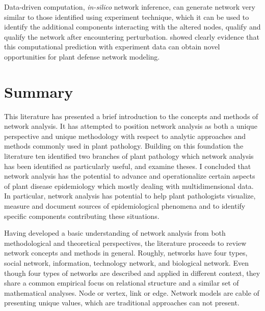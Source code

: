 Data-driven computation, \textit{in-silico} network inference, can generate network very similar to those identified using experiment technique, which it can be used to identify the additional components interacting with the altered nodes, qualify and qualify the network after encountering perturbation.  showed clearly evidence that this computational prediction with experiment data can obtain novel opportunities for plant defense network modeling. 

\section*{Summary}
\label{ch:summary}

This literature has presented a brief introduction to the concepts and methods of network analysis. It has attempted to position network analysis as both a unique perspective and unique methodology with respect to analytic approaches and methods commonly used in plant pathology. Building on this foundation the literature ten identified two branches of plant pathology which network analysis has been identified as particularly useful, and examine theses. I concluded that network analysis has the potential to advance and operationalize certain aspects of plant disease epidemiology which mostly dealing with multidimensional data. In particular, network analysis has potential to help plant pathologists visualize, measure and document sources of epidemiological phenomena and to identify specific components contributing these situations.  

Having developed a basic understanding of network analysis from both methodological and theoretical perspectives, the literature proceeds to review network concepts and methods in general. Roughly, networks have four types, social network, information, technology network, and biological network. Even though four types of networks are described and applied in different context, they share a common empirical focus on relational structure and a similar set of mathematical analyses. Node or vertex, link or edge. Network models are cable of presenting unique values, which are traditional approaches can not present. 

